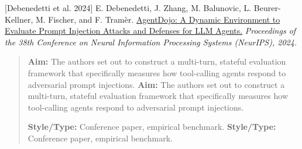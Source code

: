 \documentclass[11pt, a4paper]{article}
\begin{document}
\noindent \hypertarget{p1}{[Debenedetti et al. 2024]} E. Debenedetti, J. Zhang, M. Balunovic, L. Beurer-Kellner, M. Fischer, and F. Tram\`er. \href{https://arxiv.org/abs/2406.13352}{AgentDojo: A Dynamic Environment to Evaluate Prompt Injection Attacks and Defenses for LLM Agents.} \textit{Proceedings of the 38th Conference on Neural Information Processing Systems (NeurIPS), 2024.}
\begin{quote}
\textbf{Aim:} The authors set out to construct a multi-turn, stateful evaluation framework that specifically measures how tool-calling agents respond to adversarial prompt injections.
\textbf{Aim:} The authors set out to construct a multi-turn, stateful evaluation framework that specifically measures how tool-calling agents respond to adversarial prompt injections.

\vspace{0.5em}
\textbf{Style/Type:} Conference paper, empirical benchmark.
\textbf{Style/Type:} Conference paper, empirical benchmark.


\end{quote}
\end{document}
